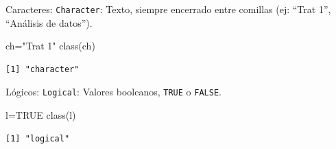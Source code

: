 \documentclass[
  ignorenonframetext,
  aspectratio=169,
  spanish,
]{beamer}
\newenvironment{Shaded}{\begin{snugshade}}{\end{snugshade}}
\newcommand{\ConstantTok}[1]{\textcolor[rgb]{0.56,0.35,0.01}{#1}}
\newcommand{\FunctionTok}[1]{\textcolor[rgb]{0.28,0.35,0.67}{#1}}
\newcommand{\NormalTok}[1]{\textcolor[rgb]{0.00,0.23,0.31}{#1}}
\newcommand{\OtherTok}[1]{\textcolor[rgb]{0.00,0.23,0.31}{#1}}
\newcommand{\StringTok}[1]{\textcolor[rgb]{0.13,0.47,0.30}{#1}}
\begin{document}
\begin{frame}[fragile]{Caracteres:}
\label{caracteres}
\texttt{Character}: Texto, siempre encerrado entre comillas (ej: ``Trat
1'', ``Análisis de datos'').

\begin{Shaded}
\begin{Highlighting}[]
\NormalTok{ch}\OtherTok{=}\StringTok{"Trat 1"}  
\FunctionTok{class}\NormalTok{(ch) }
\end{Highlighting}
\end{Shaded}

\begin{verbatim}
[1] "character"
\end{verbatim}
\end{frame}

\begin{frame}[fragile]{Lógicos:}
\label{luxf3gicos}
\texttt{Logical}: Valores booleanos, \texttt{TRUE} o \texttt{FALSE}.

\begin{Shaded}
\begin{Highlighting}[]
\NormalTok{l}\OtherTok{=}\ConstantTok{TRUE}  
\FunctionTok{class}\NormalTok{(l)  }
\end{Highlighting}
\end{Shaded}

\begin{verbatim}
[1] "logical"
\end{verbatim}
\end{frame}
\end{document}
